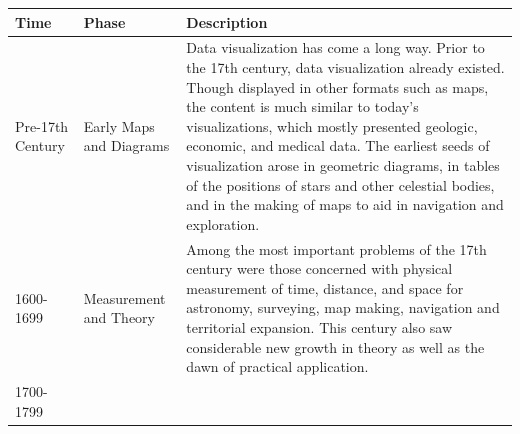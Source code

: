\documentclass[]{book}
\theoremstyle{definition}
\theoremstyle{definition}
\theoremstyle{definition}
\theoremstyle{remark}
\begin{document}
\begin{longtable}[]{@{}lll@{}}
\toprule
\begin{minipage}[b]{0.07\columnwidth}\raggedright\strut
\textbf{Time}\strut
\end{minipage} & \begin{minipage}[b]{0.08\columnwidth}\raggedright\strut
\textbf{Phase}\strut
\end{minipage} & \begin{minipage}[b]{0.76\columnwidth}\raggedright\strut
\textbf{Description}\strut
\end{minipage}\tabularnewline
\midrule
\endhead
\begin{minipage}[t]{0.07\columnwidth}\raggedright\strut
Pre-17th Century\strut
\end{minipage} & \begin{minipage}[t]{0.08\columnwidth}\raggedright\strut
Early Maps and Diagrams\strut
\end{minipage} & \begin{minipage}[t]{0.76\columnwidth}\raggedright\strut
Data visualization has come a long way. Prior to the 17th century, data
visualization already existed. Though displayed in other formats such as
maps, the content is much similar to today's visualizations, which
mostly presented geologic, economic, and medical data. The earliest
seeds of visualization arose in geometric diagrams, in tables of the
positions of stars and other celestial bodies, and in the making of maps
to aid in navigation and exploration.\strut
\end{minipage}\tabularnewline
\begin{minipage}[t]{0.07\columnwidth}\raggedright\strut
1600-1699\strut
\end{minipage} & \begin{minipage}[t]{0.08\columnwidth}\raggedright\strut
Measurement and Theory\strut
\end{minipage} & \begin{minipage}[t]{0.76\columnwidth}\raggedright\strut
Among the most important problems of the 17th century were those
concerned with physical measurement of time, distance, and space for
astronomy, surveying, map making, navigation and territorial expansion.
This century also saw considerable new growth in theory as well as the
dawn of practical application.\strut
\end{minipage}\tabularnewline
\begin{minipage}[t]{0.07\columnwidth}\raggedright\strut
1700-1799\strut
\end{minipage} & \begin{minipage}[t]{0.08\columnwidth}\raggedright\strut

\end{minipage}
\end{longtable}
\end{document}
